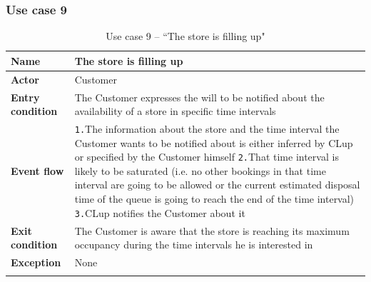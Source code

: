 \documentclass[a4paper,oneside,11pt]{book}   %
\begin{document}
    \subsubsection{Use case 9}
    \begin{longtable}[c] { |>{\bfseries{}}C{0.25\textwidth}|V{0.55\textwidth}| }
        \hline
        Name            & The store is filling up \\ \hline
        Actor           & Customer \\ \hline
        Entry condition & The Customer expresses the will to be notified about the availability of a store in specific time intervals \\ \hline
        Event flow      & 
        \texttt{1.}The information about the store and the time interval the Customer wants to be notified about is either inferred by CLup or specified by the Customer himself \newline
        \texttt{2.}That time interval is likely to be saturated (i.e. no other bookings in that time interval are going to be allowed or the current estimated disposal time of the queue is going to reach the end of the time interval) \newline
        \texttt{3.}CLup notifies the Customer about it \\ \hline
        Exit condition  & The Customer is aware that the store is reaching its maximum occupancy during the time intervals he is interested in \\ \hline
        Exception       & None \\
        \hline
    \caption{Use case 9 -- ``The store is filling up"}
    \label{table:use_case_09}
    \end{longtable}
    
\end{document}
